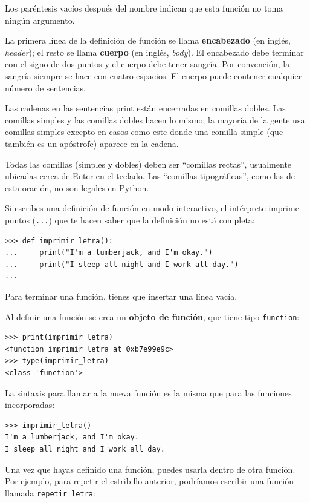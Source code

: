 \documentclass[10pt]{book}
\begin{document}
Los paréntesis vacíos después del nombre indican que esta función
no toma ningún argumento.

La primera línea de la definición de función se llama {\bf encabezado} (en inglés, {\em header});
el resto se llama {\bf cuerpo} (en inglés, {\em body}).  El encabezado debe terminar con el signo de dos puntos
y el cuerpo debe tener sangría.  Por convención, la sangría
siempre se hace con cuatro espacios.  El cuerpo puede contener
cualquier número de sentencias.

Las cadenas en las sentencias print están encerradas en comillas
dobles.  Las comillas simples y las comillas dobles hacen lo mismo;
la mayoría de la gente usa comillas simples excepto en casos como este donde
una comilla simple (que también es un apóstrofe) aparece en la cadena.

Todas las comillas (simples y dobles)
deben ser ``comillas rectas'', usualmente
ubicadas cerca de Enter en el teclado.  Las ``comillas tipográficas'', como
las de esta oración, no son legales en Python.

Si escribes una definición de función en modo interactivo, el intérprete
imprime puntos ({\tt ...}) que te hacen saber que la definición
no está completa:

\begin{verbatim}
>>> def imprimir_letra():
...     print("I'm a lumberjack, and I'm okay.")
...     print("I sleep all night and I work all day.")
...
\end{verbatim}
%
Para terminar una función, tienes que insertar una línea vacía.

Al definir una función se crea un {\bf objeto de función}, que tiene
tipo \verb"function":

\begin{verbatim}
>>> print(imprimir_letra)
<function imprimir_letra at 0xb7e99e9c>
>>> type(imprimir_letra)
<class 'function'>
\end{verbatim}
%
La sintaxis para llamar a la nueva función es la misma que
para las funciones incorporadas:

\begin{verbatim}
>>> imprimir_letra()
I'm a lumberjack, and I'm okay.
I sleep all night and I work all day.
\end{verbatim}
%
Una vez que hayas definido una función, puedes usarla dentro de otra
función.  Por ejemplo, para repetir el estribillo anterior, podríamos escribir
una función llamada \verb"repetir_letra":
\end{document}
